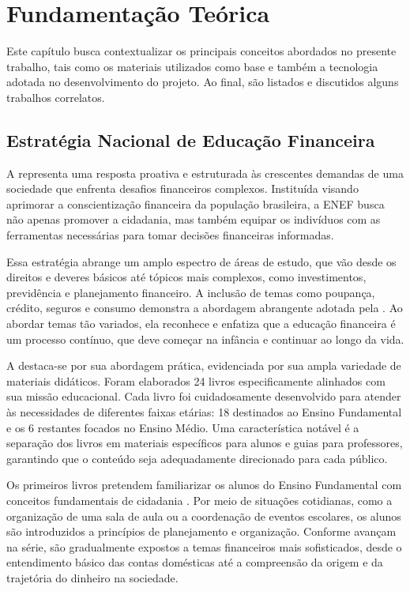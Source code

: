 \chapter{Fundamentação Teórica}
Este capítulo busca contextualizar os principais conceitos abordados no presente trabalho, tais como os materiais utilizados como base e também a tecnologia adotada no desenvolvimento do projeto. Ao final, são listados e discutidos alguns trabalhos correlatos.

\section{Estratégia Nacional de Educação Financeira}

A \cite{ENEF} representa uma resposta proativa e estruturada às crescentes demandas de uma sociedade que enfrenta desafios financeiros complexos. Instituída visando aprimorar a conscientização financeira da população brasileira, a ENEF busca não apenas promover a cidadania, mas também equipar os indivíduos com as ferramentas necessárias para tomar decisões financeiras informadas.

Essa estratégia abrange um amplo espectro de áreas de estudo, que vão desde os direitos e deveres básicos até tópicos mais complexos, como investimentos, previdência e planejamento financeiro. A inclusão de temas como poupança, crédito, seguros e consumo demonstra a abordagem abrangente adotada pela \cite{ENEF}. Ao abordar temas tão variados, ela reconhece e enfatiza que a educação financeira é um processo contínuo, que deve começar na infância e continuar ao longo da vida.

A \cite{ENEF} destaca-se por sua abordagem prática, evidenciada por sua ampla variedade de materiais didáticos. Foram elaborados 24 livros especificamente alinhados com sua missão educacional. Cada livro foi cuidadosamente desenvolvido para atender às necessidades de diferentes faixas etárias: 18 destinados ao Ensino Fundamental e os 6 restantes focados no Ensino Médio. Uma característica notável é a separação dos livros em materiais específicos para alunos e guias para professores, garantindo que o conteúdo seja adequadamente direcionado para cada público.

Os primeiros livros pretendem familiarizar os alunos do Ensino Fundamental com conceitos fundamentais de cidadania \cite{ENEF_EF}. Por meio de situações cotidianas, como a organização de uma sala de aula ou a coordenação de eventos escolares, os alunos são introduzidos a princípios de planejamento e organização. Conforme avançam na série, são gradualmente expostos a temas financeiros mais sofisticados, desde o entendimento básico das contas domésticas até a compreensão da origem e da trajetória do dinheiro na sociedade.

